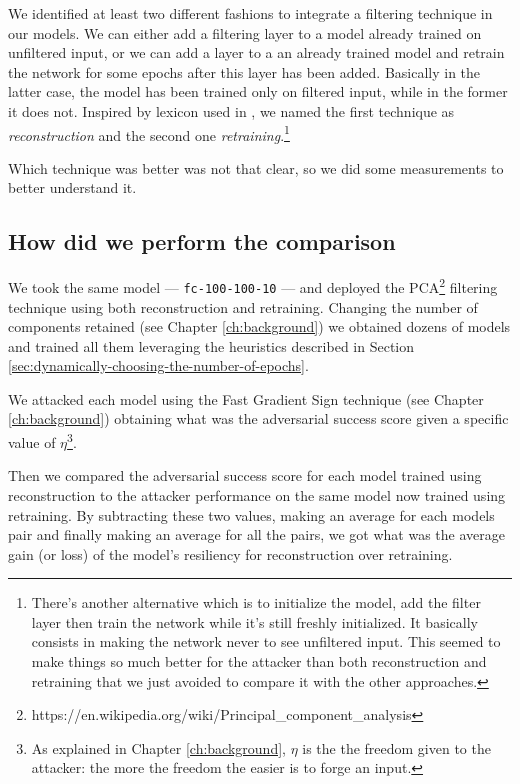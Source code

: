 We identified at least two different fashions to integrate a filtering
technique in our models. We can either add a filtering layer to a model
already trained on unfiltered input, or we can add a layer to a an
already trained model and retrain the network for some epochs after
this layer has been added. Basically in the latter case, the model has
been trained only on filtered input, while in the former it does not.
Inspired by lexicon used in \cite{bhagoji2018enhancing}, we named the
first technique as \emph{reconstruction} and the second one
\emph{retraining}.\footnote{There's another alternative which is to
  initialize the model, add the filter layer then train the network
  while it's still freshly initialized. It basically consists in making
  the network never to see unfiltered input. This seemed to make things
  so much better for the attacker than both reconstruction and
  retraining that we just avoided to compare it with the other
  approaches.}

Which technique was better was not that clear, so we did some
measurements to better understand it.

\subsection{How did we perform the comparison}

We took the same model --- \texttt{fc-100-100-10} --- and deployed the
PCA\footnote{https://en.wikipedia.org/wiki/Principal\_component\_analysis}
filtering technique using both reconstruction and retraining. Changing
the number of components retained (see Chapter \ref{ch:background}) we
obtained dozens of models and trained all them leveraging the
heuristics described in Section
\ref{sec:dynamically-choosing-the-number-of-epochs}.

We attacked each model using the Fast Gradient Sign technique (see
Chapter \ref{ch:background}) obtaining what was the adversarial success
score given a specific value of $\eta$\footnote{As explained in Chapter
  \ref{ch:background}, $\eta$ is the the freedom given to the attacker:
  the more the freedom the easier is to forge an input.}.

Then we compared the adversarial success score for each model trained
using reconstruction to the attacker performance on the same model now
trained using retraining. By subtracting these two values, making an
average for each models pair and finally making an average for all the
pairs, we got what was the average gain (or loss) of the model's
resiliency for reconstruction over retraining.

